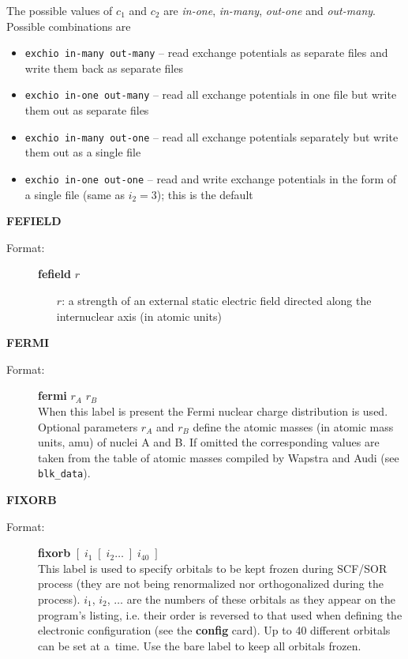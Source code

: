 \documentclass[12pt,a4paper]{article}
\newcommand{\ft}[1]{\texttt{#1}}
\newcommand{\fb}[1]{\textbf{#1}}
\begin{document}
\begin{description}
\begin{description}
The possible values of $c_1$ and $c_2$ are \textsl{in-one},
\textsl{in-many}, \textsl{out-one} and \textsl{out-many}. Possible
combinations are
\begin{itemize}
\item \verb+exchio in-many out-many+ -- read exchange potentials as separate files and
  write them back as separate files

\item \verb+exchio in-one out-many+ -- read all exchange potentials in one file but write
  them out as separate files

\item \verb+exchio in-many out-one+ -- read all exchange potentials separately but write
  them out as a single file

\item \verb+exchio in-one out-one+ -- read and write exchange potentials in the form of a
  single file (same as $i_2=3$); this is the default
\end{itemize}

\end{description}


\item \textbf{FEFIELD}
\begin{description}
\item[Format:] \textbf{fefield} $r$
\begin{itemize}
\item[$r$:] a strength of an external static electric field directed along
  the internuclear axis (in atomic units)
\end{itemize}
\end{description}



\item \textbf{FERMI}
\begin{description}
\item[Format:] \textbf{fermi} $r_A$ $r_B$ \\ When this label is
  present the Fermi nuclear charge distribution is used. Optional
  parameters $r_A$ and $r_B$ define the atomic masses (in atomic mass
  units, amu) of nuclei A and B. If omitted the corresponding values are
  taken from the table of atomic masses compiled by Wapstra and Audi
  (see \ft{blk\_data}).
\end{description}


\item \textbf{FIXORB}
\begin{description}
\item[Format:] \textbf{fixorb} $[\; i_1 \; [\;i_2 \ldots \;] \;i_{40}\;]$ \\ This label is
  used to specify orbitals to be kept frozen during SCF/SOR process (they are not being
  renormalized nor orthogonalized during the process). $i_1$, $i_2$, $\ldots$ are the
  numbers of these orbitals as they appear on the program's listing, i.e. their order is
  reversed to that used when defining the electronic configuration (see the \fb{config}
  card). Up to 40 different orbitals can be set at a~time. Use the bare label to keep all
  orbitals frozen.


\end{description}
\end{description}
\end{document}
